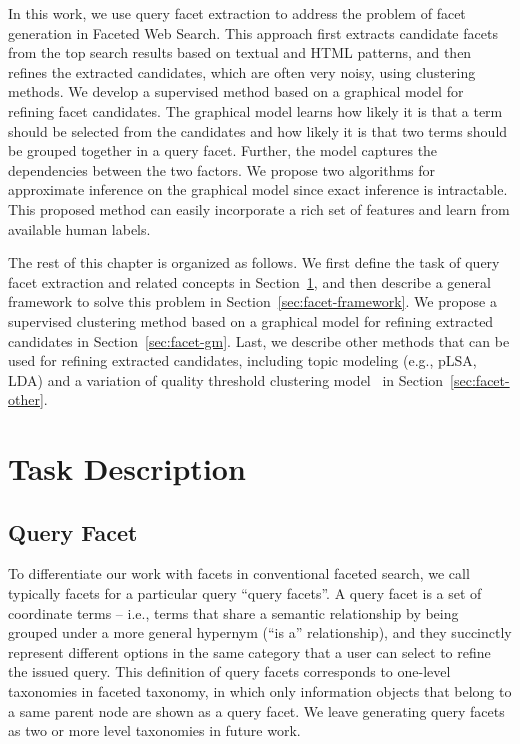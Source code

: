 In this work, we use query facet extraction to address the problem of facet generation in Faceted Web Search. This approach first extracts candidate facets from the top search results based on textual and HTML patterns, and then refines the extracted candidates, which are often very noisy, using clustering methods. We develop a supervised method based on a graphical model for refining facet candidates. The graphical model learns how likely it is that a term should be selected from the candidates and how likely it is that two terms should be grouped together in a query facet. Further, the model captures the dependencies between the two factors. We propose two algorithms for approximate inference on the graphical model since  exact inference is intractable. This proposed method can easily incorporate a rich set of features and learn from available human labels.

The rest of this chapter is organized as follows. We first define the task of query facet extraction and related concepts in Section~\ref{sec:facet-task}, and then describe a general framework to solve this problem in Section~\ref{sec:facet-framework}. We propose a supervised clustering method based on a graphical model for refining extracted candidates in Section~\ref{sec:facet-gm}. Last, we describe other methods that can be used for refining extracted candidates, including topic modeling (e.g., pLSA, LDA) and a variation of quality threshold clustering model~\cite{dou2011finding} in Section~\ref{sec:facet-other}. 

\section{Task Description}
\label{sec:facet-task}
\subsection{Query Facet}
To differentiate our work with facets in conventional faceted search, we call typically facets for a particular query ``query facets''. A query facet is a set of coordinate terms -- i.e., terms that share a semantic relationship by being grouped under a more general hypernym (``is a'' relationship), and they succinctly represent different options in the same category that a user can select to refine the issued query. This definition of query facets corresponds to one-level taxonomies in faceted taxonomy, in which only information objects that belong to a same parent node are shown as a query facet. We leave generating query facets as two or more level taxonomies in future work.

